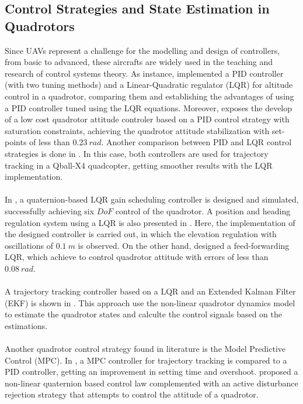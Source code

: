 \subsection{Control Strategies and State Estimation in Quadrotors}
Since UAVs represent a challenge for the modelling and design of controllers, from basic to advanced, these aircrafts are widely used in the teaching and research of control systems theory. As instance, \cite{Argentim2013} implemented a PID controller (with two tuning methods) and a Linear-Quadratic regulator (LQR) for altitude control in a quadrotor, comparing them and establishing the advantages of using a PID controller tuned using the LQR equations. Moreover, \cite{Silva2016} exposes the develop of a low cost quadrotor attitude controler based on a PID control strategy with saturation constraints, achieving the quadrotor attitude stabilization with set-points of less than $0.23\ rad$. Another comparison between PID and LQR control strategies is done in \cite{Liu2016}. In this case, both controllers are used for trajectory tracking in a Qball-X4 quadcopter, getting smoother results with the LQR implementation.
\\\\
In \cite{Reyes-Valeria2013}, a quaternion-based LQR gain scheduling controller is designed and simulated, successfully achieving six $DoF$ control of the quadrotor. A position and heading regulation system using a LQR is also presented in \cite{Dong2015}. Here, the implementation of the designed controller is carried out, in which the elevation regulation with oscillations of $0.1\ m$ is observed. On the other hand, \cite{Fan2017} designed a feed-forwarding LQR, which achieve to control quadrotor attitude with errors of less than $0.08\ rad$.
\\\\
A trajectory tracking controller based on a LQR and an Extended Kalman Filter (EKF) is shown in \cite{Zhang2016}. This approach use the non-linear quadrotor dynamics model to estimate the quadrotor states and calculte the control signals based on the estimations.
\\\\
Another quadrotor control strategy found in literature is the Model Predictive Control (MPC). In \cite{Configuration2017}, a MPC controller for trajectory tracking is compared to a PID controller, getting an improvement in setting time and overshoot. \cite{Castillo201603a} proposed a non-linear quaternion based control law complemented with an active disturbance rejection strategy that attempts to control the attitude of a quadrotor.
